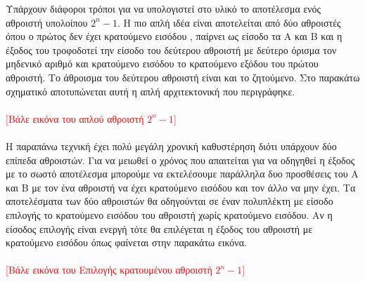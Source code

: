 Υπάρχουν διάφοροι τρόποι για να υπολογιστεί στο υλικό το αποτέλεσμα 
ενός αθροιστή υπολοίπου $2^n-1$.
Η πιο απλή ιδέα είναι αποτελείται από δύο αθροιστές όπου ο πρώτος δεν έχει
κρατούμενο εισόδου , παίρνει ως είσοδο τα Α και Β και η έξοδος του τροφοδοτεί
την είσοδο του δεύτερου αθροιστή με δεύτερο όρισμα τον μηδενικό αριθμό
και κρατούμενο εισόδου το κρατούμενο εξόδου του πρώτου αθροιστή. Το άθροισμα 
του δεύτερου αθροιστή είναι και το ζητούμενο. Στο παρακάτω σχηματικό αποτυπώνεται
αυτή η απλή αρχιτεκτονική που περιγράφηκε.
\\\\
\textcolor{red}{[Βάλε εικόνα του απλού αθροιστή $2^n-1$]}
\\\\
Η παραπάνω τεχνική έχει πολύ μεγάλη χρονική καθυστέρηση διότι υπάρχουν δύο 
επίπεδα αθροιστών. Για να μειωθεί ο χρόνος που απαιτείται για να οδηγηθεί η έξοδος
με το σωστό αποτέλεσμα μπορούμε να εκτελέσουμε παράλληλα δυο προσθέσεις του Α και Β
με τον ένα αθροιστή να έχει κρατούμενο εισόδου και τον άλλο να μην έχει. Τα αποτελέσματα 
των δύο αθροιστών θα οδηγούνται σε έναν πολυπλέκτη με είσοδο επιλογής το κρατούμενο 
εισόδου του αθροιστή χωρίς κρατούμενο εισόδου. Αν η είσοδος επιλογής είναι ενεργή 
τότε θα επιλέγεται η έξοδος του αθροιστή με κρατούμενο εισόδου όπως φαίνεται στην 
παρακάτω εικόνα.
\\\\
\textcolor{red}{[Βάλε εικόνα του Επιλογής κρατουμένου αθροιστή $2^n-1$]}

















